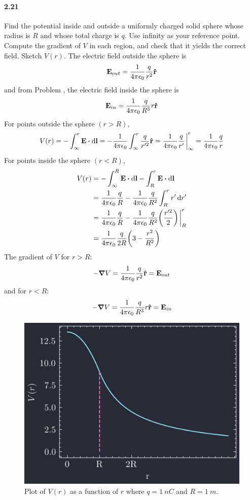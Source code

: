 \documentclass[../main.tex]{subfiles}
\begin{document}
\paragraph{2.21} \label{prob:2_21}
Find the potential inside and outside a uniformly charged solid sphere whose radius is $R$ and whose
total charge is $q$. Use infinity as your reference point. Compute the gradient of $V$ in each
region, and check that it yields the correct field. Sketch $V(r)$.
\barh
The electric field outside the sphere is
\[ \vb{E}_{out} = \frac{1}{4\pi\epsilon_0} \frac{q}{r^2} \vu{r} \]
and from Problem , the electric field inside the sphere is
\[ \vb{E}_{in} = \frac{1}{4\pi\epsilon_0} \frac{q}{R^3} r \vu{r} \]
For points outside the sphere $(r > R)$,
\[
    V(r) = - \int_\infty^r \vb{E} \vdot \dd{\vb{l}} = - \ke \int_\infty^r \frac{q}{r'^2} \vu{r}
    = \ke \frac{q}{r'} \eval_\infty^r = \ke \frac{q}{r}
\]
For points inside the sphere $(r < R)$,
\begin{align*}
    V(r) &= - \int_\infty^R \vb{E} \vdot \dd{\vb{l}} - \int_R^r \vb{E} \vdot \dd{\vb{l}} \\
    &= \ke \frac{q}{R} - \ke \frac{q}{R^2} \int_R^r r' \dd{r'} \\
    &= \ke \frac{q}{R} - \ke \frac{q}{R^2} \qt(\frac{r'^2}{2}) \eval_R^r \\
    &= \ke \frac{q}{2R} \qt(3 - \frac{r^2}{R^2}) 
\end{align*}
The gradient of $V$ for $r > R$:
\[ -\grad V = \frac{1}{4\pi\epsilon_0} \frac{q}{r^2} \vu{r} = \vb{E}_{out} \]
and for $r < R$:
\[ -\grad V = \frac{1}{4\pi\epsilon_0} \frac{q}{R^3} r \vu{r} = \vb{E}_{in} \]
\begin{figure}[ht]
    \centering
    \includegraphics[width=0.5\linewidth]{images/fig2_21.png}
    \captionsetup{width=0.8\linewidth}
    \caption{Plot of $V(r)$ as a function of $r$ where $q = \qty{1}{nC}$ and $R = \qty{1}{m}$.}
    \label{fig:2_21}
\end{figure}
\end{document}
